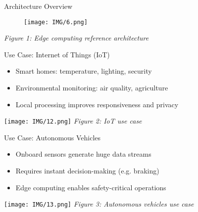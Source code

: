 \documentclass{beamer}
\begin{document}
\begin{frame}{Architecture Overview}
  \vspace{0.5cm}
  \centering
  \begin{figure}
    \centering
    \texttt{[image: IMG/6.png]} %
  \end{figure}
  \vspace{0.2cm}
  \small \textit{Figure 1: Edge computing reference architecture}
\end{frame}

\begin{frame}{Use Case: Internet of Things (IoT)}
  \begin{itemize}
    \item Smart homes: temperature, lighting, security
    \item Environmental monitoring: air quality, agriculture
    \item Local processing improves responsiveness and privacy
  \end{itemize}
  \vspace{0.5cm}
  \centering
  \texttt{[image: IMG/12.png]} %
  \vspace{0.2cm}
  \small \textit{Figure 2: IoT use case}
\end{frame}

\begin{frame}{Use Case: Autonomous Vehicles}
  \begin{itemize}
    \item Onboard sensors generate huge data streams
    \item Requires instant decision-making (e.g. braking)
    \item Edge computing enables safety-critical operations
  \end{itemize}
  \vspace{0.2cm}
  \centering
  \texttt{[image: IMG/13.png]} %
  \vspace{0.2cm}
  \small \textit{Figure 3: Autonomous vehicles use case}
\end{frame}
\end{document}
